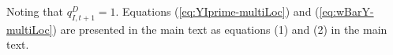 \documentclass{article}
\newcommand\numberthis{\addtocounter{equation}{1}\tag{\theequation}}
\begin{document}
\begin{appendices}
\noindent Noting that $q^{D}_{I,{t+1}} = 1$. Equations (\ref{eq:YIprime-multiLoc}) and (\ref{eq:wBarY-multiLoc}) are presented in the main text as equations (1) and (2) in the main text.
















\end{appendices}
\end{document}
